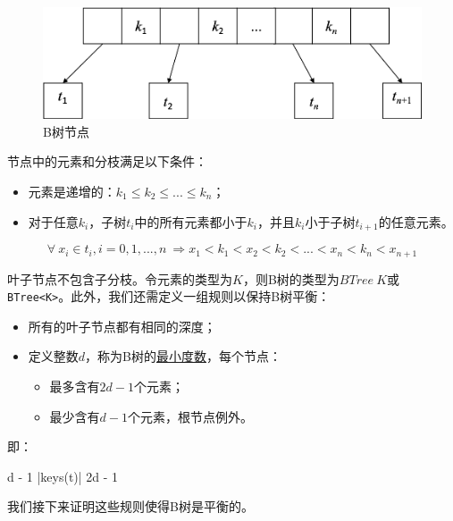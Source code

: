 \documentclass{ctexart}
\begin{document}
\begin{figure}[htbp]
  \centering
  \includegraphics[scale=0.5]{img/btree-node.png}
  \caption{B树节点}
  \label{fig:btree-node}
\end{figure}

节点中的元素和分枝满足以下条件：

\begin{itemize}
\item 元素是递增的：$k_1 \leq k_2 \leq ... \leq k_n$；
\item 对于任意$k_i$，子树$t_i$中的所有元素都小于$k_i$，并且$k_i$小于子树$t_{i+1}$的任意元素。
\end{itemize}

\begin{equation}
\forall\ x_i \in t_i, i=0, 1, ..., n\ \Rightarrow x_1 < k_1 < x_2 < k_2 < ... < x_n < k_n < x_{n+1}
\label{eq:btree-order}
\end{equation}

叶子节点不包含子分枝。令元素的类型为$K$，则B树的类型为$BTree\ K$或\texttt{BTree<K>}。此外，我们还需定义一组规则以保持B树平衡：

\begin{itemize}
\item 所有的叶子节点都有相同的深度；
\item 定义整数$d$，称为B树的\underline{最小度数}，每个节点：
    \begin{itemize}
        \item 最多含有$2d - 1$个元素；
        \item 最少含有$d - 1$个元素，根节点例外。
    \end{itemize}
\end{itemize}

即：

\be
  d - 1 \leq |keys(t)|  \leq 2d - 1
\ee

我们接下来证明这些规则使得B树是平衡的。
\end{document}

